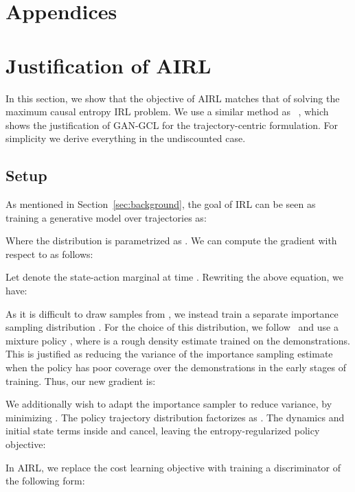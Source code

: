 \documentclass{article} \usepackage{iclr2018_conference,times}
\begin{document}
\clearpage
\appendix
\section*{Appendices}

\section{Justification of AIRL}
\label{app:gan_irl_proof}
In this section, we show that the objective of AIRL matches that of solving the maximum causal entropy IRL problem. We use a similar method as ~\citet{Finn16b}, which shows the justification of GAN-GCL for the trajectory-centric formulation. For simplicity we derive everything in the undiscounted case.

\subsection{Setup}






As mentioned in Section~\ref{sec:background}, the goal of IRL can be seen as training a generative model over trajectories as:

Where the distribution  is parametrized as . We can compute the gradient with respect to  as follows:


Let  denote the state-action marginal at time . Rewriting the above equation, we have:


As it is difficult to draw samples from , we instead train a separate importance sampling distribution . For the choice of this distribution, we follow~\citet{Finn16b} and use a mixture policy , where  is a rough density estimate trained on the demonstrations. This is justified as reducing the variance of the importance sampling estimate when the policy  has poor coverage over the demonstrations in the early stages of training. Thus, our new gradient is:


We additionally wish to adapt the importance sampler  to reduce variance, by minimizing . The policy trajectory distribution factorizes as . The dynamics and initial state terms inside  and  cancel, leaving the entropy-regularized policy objective:





In AIRL, we replace the cost learning objective with training a discriminator of the following form:
\end{document}
